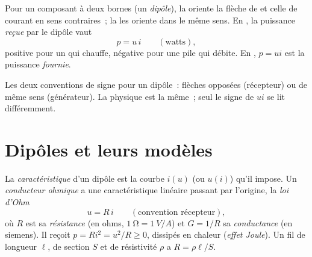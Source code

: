 \begin{notation}\label{not:b1:dc-circuits:conventions}
Pour un composant à deux bornes (un \emph{dipôle}), la \emph{} oriente la flèche de  et celle de courant en sens
contraires~; la \emph{} les oriente dans le même
sens. En , la puissance \emph{reçue} par le dipôle
vaut
\[
p = u\,i \qquad (\text{watts}),
\]
positive pour un  qui chauffe, négative pour une pile
qui débite. En , $p = ui$ est la puissance
\emph{fournie}.
\end{notation}

\begin{omfigure}

{\small Les deux conventions de signe pour un dipôle~: flèches opposées
(récepteur) ou de même sens (générateur). La physique est la même~; seul
le signe de $ui$ se lit différemment.}
\end{omfigure}

\section{Dipôles et leurs modèles}

\begin{definition}\label{def:b1:dc-circuits:resistor}
La \emph{caractéristique} d'un dipôle est la courbe $i(u)$ (ou $u(i)$)
qu'il impose. Un \emph{conducteur ohmique} a une caractéristique
linéaire passant par l'origine, la \emph{loi d'Ohm}
\[
u = R\,i \qquad (\text{convention récepteur}),
\]
où $R$ est sa \emph{résistance} (en ohms, $\qty{1}{\ohm} = \qty{1}{V/A}$)
et $G = 1/R$ sa \emph{conductance} (en siemens). Il reçoit $p = Ri^2 =
u^2/R \geq 0$, dissipés en chaleur (\emph{effet Joule}). Un fil de
longueur $\ell$, de section $S$ et de résistivité $\rho$ a
$R = \rho\ell/S$.
\end{definition}


